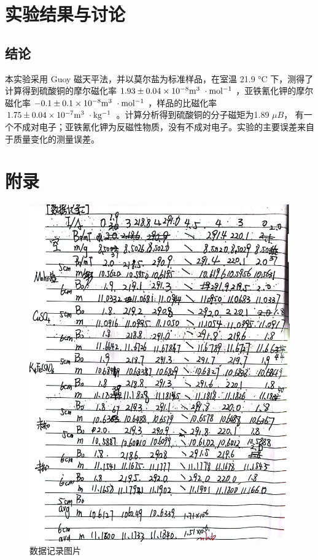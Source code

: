 \documentclass[cn,hazy,pku,12pt,normal,math=newtx,cite=super]{elegantnote}
\begin{document}
\section{实验结果与讨论}
\subsection{结论}

本实验采用 Guoy 磁天平法，并以莫尔盐为标准样品，在室温 21.9 °C 下，测得了计算得到硫酸铜的摩尔磁化率 $\rm 1.93 \pm 0.04 \times 10^{-8} m^3\ \cdot mol^{-1}$
，亚铁氰化钾的摩尔磁化率 $\rm - 0.1 \pm 0.1 \times 10^{-8} m^3\ \cdot mol^{-1}$
，样品的比磁化率 $\rm 1.75 \pm 0.04 \times 10^{-7} m^3\ \cdot kg^{-1}$ 。计算分析得到硫酸铜的分子磁矩为1.89 $\mu B$，
有一个不成对电子；亚铁氰化钾为反磁性物质，没有不成对电子。实验的主要误差来自于质量变化的测量误差。

\newpage

\section{附录}
\begin{figure}[htbp]
    \centering
    \includegraphics[width = .70\textwidth]{image/sysj.jpg}
    \caption{数据记录图片}\label{3}
\end{figure}
\nocite{*}

\newpage

\end{document}
